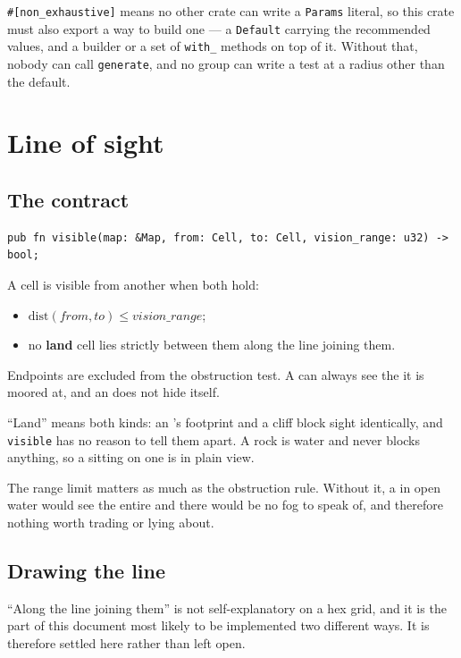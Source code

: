 \documentclass{article}
\begin{document}
\texttt{\#[non\_exhaustive]} means no other crate can write a \texttt{Params} literal, so this
crate must also export a way to build one --- a \texttt{Default} carrying the recommended values,
and a builder or a set of \texttt{with\_} methods on top of it. Without that, nobody can call
\texttt{generate}, and no group can write a test at a radius other than the default.

\newpage
\section{Line of sight}
\label{proto:los}

\subsection{The contract}

\begin{lstlisting}
pub fn visible(map: &Map, from: Cell, to: Cell, vision_range: u32) -> bool;
\end{lstlisting}

A cell is visible from another when both hold:

\begin{itemize}
    \item $\mathrm{dist}(\mathit{from}, \mathit{to}) \leq \mathit{vision\_range}$;
    \item no \textbf{land} cell lies strictly between them along the line joining them.
\end{itemize}

Endpoints are excluded from the obstruction test. A \ship{} can always see the \island{} it is
moored at, and an \island{} does not hide itself.

``Land'' means both kinds: an \island's footprint and a cliff block sight identically, and
\texttt{visible} has no reason to tell them apart. A rock is water and never blocks anything, so a
\ship{} sitting on one is in plain view.

The range limit matters as much as the obstruction rule. Without it, a \ship{} in open water would
see the entire \archipelago{} and there would be no fog to speak of, and therefore nothing worth
trading or lying about.

\subsection{Drawing the line}
\label{proto:losdecide}

``Along the line joining them'' is not self-explanatory on a hex grid, and it is the part of this
document most likely to be implemented two different ways. It is therefore settled here rather than
left open.
\end{document}
